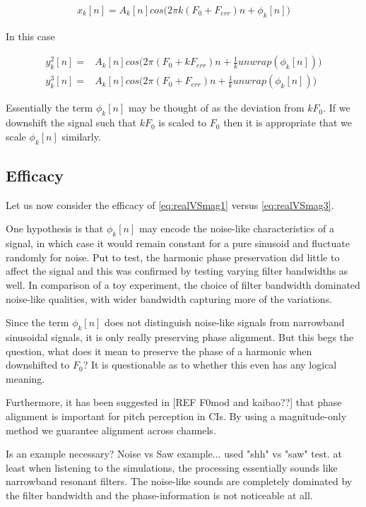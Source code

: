 \documentclass [11pt, proquest] {uwthesis}[2015/03/03]
\begin{document}
\begin{align}
x_k[n] = A_k[n]cos\Big(2\pi k(F_0 + F_{err})n + \phi_k[n]\Big)
\end{align}

In this case

\begin{align}
y_k^2[n] =& A_k[n]cos\Big(2\pi (F_0 + kF_{err})n + \frac{1}{k}unwrap(\phi_k[n])\Big) \\
y_k^3[n] =& A_k[n]cos\Big(2\pi (F_0 + F_{err})n + \frac{1}{k}unwrap(\phi_k[n])\Big)
\end{align}

Essentially the term $\phi_k[n]$ may be thought of as the deviation from $kF_0$.  If we downshift the signal such that $kF_0$ is scaled to $F_0$ then it is appropriate that we scale $\phi_k[n]$ similarly.

\subsection{Efficacy}

Let us now consider the efficacy of \ref{eq:realVSmag1} versus  \ref{eq:realVSmag3}.

One hypothesis is that $\phi_k[n]$ may encode the noise-like characteristics of a signal, in which case it would remain constant for a pure sinusoid and fluctuate randomly for noise.  Put to test, the harmonic phase preservation did little to affect the signal and this was confirmed by testing varying filter bandwidths as well.  In comparison of a toy experiment, the choice of filter bandwidth dominated noise-like qualities, with wider bandwidth capturing more of the variations.

Since the term $\phi_k[n]$ does not distinguish noise-like signals from narrowband sinusoidal signals, it is only really preserving phase alignment.  But this begs the question, what does it mean to preserve the phase of a harmonic when downshifted to $F_0$?  It is questionable as to whether this even has any logical meaning.


Furthermore, it has been suggested in [REF F0mod and kaibao??] that phase alignment is important for pitch perception in CIs.  By using a magnitude-only method we guarantee alignment across channels.

Is an example necessary? Noise vs Saw example...
used "shh" vs "saw" test.  at least when listening to the simulations, the processing essentially sounds like narrowband resonant filters.  The noise-like sounds are completely dominated by the filter bandwidth and the phase-information is not noticeable at all.
\end{document}
